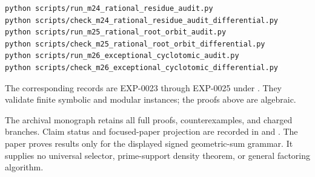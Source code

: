 \documentclass[11pt]{article}
\begin{document}
\begin{verbatim}
python scripts/run_m24_rational_residue_audit.py
python scripts/check_m24_rational_residue_audit_differential.py
python scripts/run_m25_rational_root_orbit_audit.py
python scripts/check_m25_rational_root_orbit_differential.py
python scripts/run_m26_exceptional_cyclotomic_audit.py
python scripts/check_m26_exceptional_cyclotomic_differential.py
\end{verbatim}
The corresponding records are EXP-0023 through EXP-0025 under
.  They validate finite symbolic and modular
instances; the proofs above are algebraic.

The archival monograph \archivepaper{} retains all full proofs,
counterexamples, and charged branches. Claim status and focused-paper
projection are recorded in  and
. The paper proves results only for
the displayed signed geometric-sum grammar. It supplies no universal
selector, prime-support density theorem, or general factoring algorithm.


\small

\end{document}
